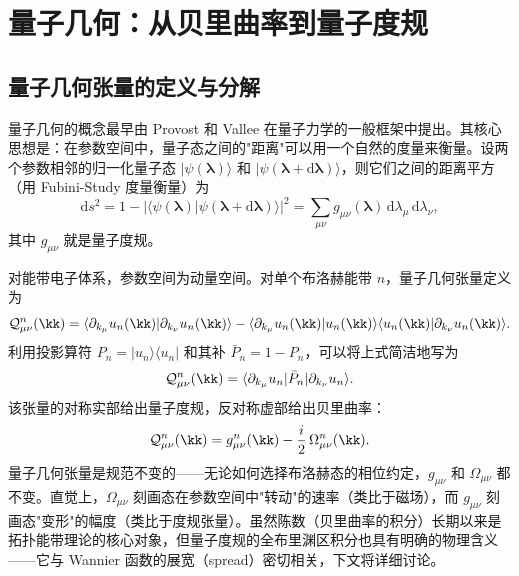 \section{量子几何：从贝里曲率到量子度规}
\label{sec:quantum-geometry}

\subsection{量子几何张量的定义与分解}

量子几何的概念最早由 Provost 和 Vallee 在量子力学的一般框架中提出\cite{Provost1980}。其核心思想是：在参数空间中，量子态之间的"距离"可以用一个自然的度量来衡量。设两个参数相邻的归一化量子态 $|\psi(\bm{\lambda})\rangle$ 和 $|\psi(\bm{\lambda}+\mathrm{d}\bm{\lambda})\rangle$，则它们之间的距离平方（用 Fubini-Study 度量衡量）为
\begin{equation}
  \mathrm{d}s^2 = 1 - |\langle \psi(\bm{\lambda}) | \psi(\bm{\lambda}+\mathrm{d}\bm{\lambda}) \rangle|^2 = \sum_{\mu\nu} g_{\mu\nu}(\bm{\lambda}) \, \mathrm{d}\lambda_\mu \, \mathrm{d}\lambda_\nu,
\end{equation}
其中 $g_{\mu\nu}$ 就是量子度规。

对能带电子体系，参数空间为动量空间。对单个布洛赫能带 $n$，量子几何张量定义为
\begin{equation}
  \mathcal{Q}_{\mu\nu}^{n}(\kk) = \langle \partial_{k_\mu} u_n(\kk) | \partial_{k_\nu} u_n(\kk) \rangle - \langle \partial_{k_\mu} u_n(\kk) | u_n(\kk) \rangle \langle u_n(\kk) | \partial_{k_\nu} u_n(\kk) \rangle.
\end{equation}
利用投影算符 $P_n = |u_n\rangle\langle u_n|$ 和其补 $\bar{P}_n = 1 - P_n$，可以将上式简洁地写为
\begin{equation}
  \mathcal{Q}_{\mu\nu}^{n}(\kk) = \langle \partial_{k_\mu} u_n | \bar{P}_n | \partial_{k_\nu} u_n \rangle.
\end{equation}
该张量的对称实部给出量子度规，反对称虚部给出贝里曲率：
\begin{equation}
  \mathcal{Q}_{\mu\nu}^{n}(\kk) = g_{\mu\nu}^{n}(\kk) - \frac{i}{2}\,\Omega_{\mu\nu}^{n}(\kk).
\end{equation}
量子几何张量是规范不变的——无论如何选择布洛赫态的相位约定，$g_{\mu\nu}$ 和 $\Omega_{\mu\nu}$ 都不变。直觉上，$\Omega_{\mu\nu}$ 刻画态在参数空间中"转动"的速率（类比于磁场），而 $g_{\mu\nu}$ 刻画态"变形"的幅度（类比于度规张量）。虽然陈数（贝里曲率的积分）长期以来是拓扑能带理论的核心对象，但量子度规的全布里渊区积分也具有明确的物理含义——它与 Wannier 函数的展宽（spread）密切相关，下文将详细讨论。

